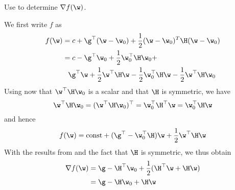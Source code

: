 \begin{exenumerate}
\item Use  to determine $\nabla f(\w)$.
  
  \begin{solution}
    We first write $f$ as
    \begin{align}
      f(\w) &= c + \g^\top(\w-\w_0)+\frac{1}{2}(\w-\w_0)^T\H(\w-\w_0) \\
            &= c - \g^\top \w_0 + \frac{1}{2} \w_0^\top\H \w_0 + \nonumber \\
            &\phantom{=} \g^\top \w + \frac{1}{2}\w^\top\H\w - \frac{1}{2} \w_0^\top \H \w - \frac{1}{2} \w^\top \H \w_0
    \end{align}
	  Using now that $\w^\top \H \w_0$ is a scalar and that $\H$ is symmetric, we have
    \begin{equation}
      \w^\top \H \w_0= (\w^\top \H \w_0)^\top = \w_0^\top \H^\top \w = \w_0^\top \H \w
    \end{equation}
    and hence
    \begin{equation}
      f(\w) = \text{const} + (\g^\top - \w_0^\top \H) \w +  \frac{1}{2}\w^\top\H\w
    \end{equation}
    With the results from  and the fact that $\H$ is symmetric, we thus obtain
    \begin{align}
      \nabla f(\w) &= \g-\H^\top \w_0 + \frac{1}{2}(\H^\top\w + \H\w) \\
                   & = \g-\H \w_0 + \H\w
    \end{align}
    

\end{solution}
\end{exenumerate}
